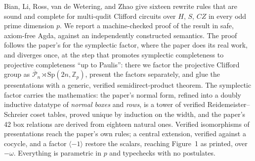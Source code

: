 Bian, Li, Ross, van de Wetering, and Zhao give sixteen rewrite rules
that are sound and complete for multi-qudit Clifford circuits over $H$,
$S$, $CZ$ in every odd prime dimension $p$.  We report a
machine-checked proof of the result in safe, axiom-free Agda, against
an independently constructed semantics.  The proof follows the
paper's for the symplectic factor, where the paper does its real work,
and diverges once, at the step that promotes symplectic completeness
to projective completeness ``up to Paulis'': there we factor the projective
Clifford group as $\overline{\mathcal P}_n \rtimes
\mathrm{Sp}(2n,\mathbb{Z}_p)$, present the factors separately, and glue
the presentations with a generic, verified semidirect-product theorem.
The symplectic factor carries the mathematics: the paper's normal form,
refined into a doubly inductive datatype of \emph{normal boxes} and
\emph{rows}, is a tower of verified Reidemeister--Schreier coset
tables, proved unique by induction on the width, and the paper's 42 box
relations are derived from eighteen natural ones.  Verified
isomorphisms of presentations reach the paper's own rules; a central
extension, verified against a cocycle, and a factor $\langle -1\rangle$
restore the scalars, reaching Figure~1 as printed, over $-\omega$.  Everything is parametric in $p$ and typechecks with no postulates.
